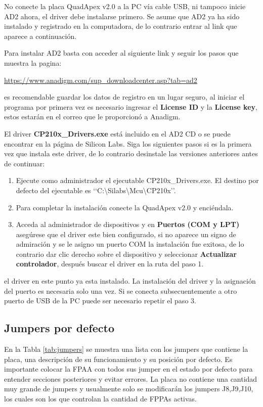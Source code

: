 	No conecte la placa QuadApex v2.0 a la PC vía cable USB,  ni tampoco inicie AD2 ahora, el driver debe instalarse primero. Se asume que AD2 ya ha sido instalado y registrado en la computadora, de lo contrario entrar al link que aparece a continuación.

	Para instalar AD2 basta con acceder al siguiente link y seguir los pasos que muestra la pagina:

	\begin{center}
		\url{https://www.anadigm.com/sup_downloadcenter.asp?tab=ad2}
	\end{center}
	es recomendable guardar los datos de registro en un lugar seguro, al iniciar el programa por primera vez es necesario ingresar el \textbf{License ID} y la \textbf{License key}, estos estarán en el correo que le proporcionó a Anadigm. 

	El driver \textbf{CP210x\_{}Drivers.exe} está incluido en el AD2 CD o se puede encontrar en la página de Silicon Labs. Siga los siguientes pasos si es la primera vez que instala este driver, de lo contrario desinstale las versiones anteriores antes de continuar:

	\begin{enumerate}
		\item Ejecute como administrador el ejecutable  CP210x\_{}Drivers.exe. El destino por defecto del ejecutable es ‘‘C:\textbackslash{}Silabs\textbackslash{}Mcu\textbackslash{}CP210x’’.
		\item Para completar la instalación conecte la QuadApex v2.0 y enciéndala.
		\item Acceda al administrador de dispositivos y en \textbf{Puertos (COM y LPT)} asegúrese que el driver este bien configurado, si no aparece un signo de admiración y se le asigno un puerto COM  la instalación fue exitosa, de lo contrario dar clic derecho sobre el dispositivo y seleccionar \textbf{Actualizar controlador}, después buscar el  driver en la ruta del paso 1.
	\end{enumerate}
	el driver en este punto ya esta instalado. La instalación del driver y la asignación del puerto es necesaria solo una vez. Si se conecta subsecuentemente a otro puerto de USB de la PC puede ser necesario repetir el paso 3.

	
		\subsection{Jumpers por defecto}
	
	En la Tabla \ref{tab:jumpers} se muestra una lista con los jumpers que contiene la placa, una descripción de su funcionamiento y su posición por defecto. Es importante colocar la FPAA con todos sus jumper en el estado por defecto para entender secciones posteriores y evitar errores. La placa no contiene una cantidad muy grande de jumpers y usualmente solo se modificarán los jumpers J8,J9,J10, los cuales son los que controlan la cantidad de FPPAs activas.
	
